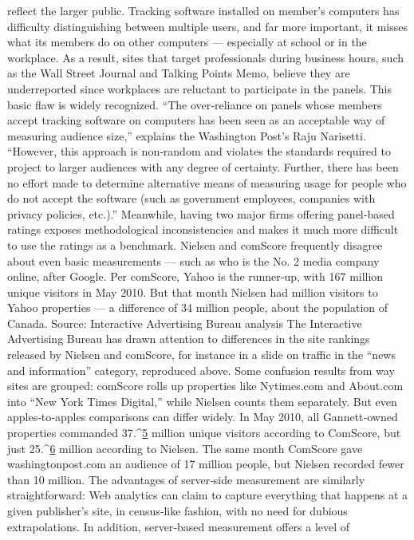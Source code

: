 reflect the larger public. Tracking software installed on member’s
computers has difficulty distinguishing between multiple users, and far
more important, it misses what its members do on other computers —
especially at school or in the workplace. As a result, sites that target
professionals during business hours, such as the Wall Street Journal and
Talking Points Memo, believe they are underreported since workplaces are
reluctant to participate in the panels.
This basic flaw is widely recognized. ``The over‐reliance on panels whose
members accept tracking software on computers has been seen as an
acceptable way of measuring audience size,'' explains the Washington
Post’s Raju Narisetti. ``However, this approach is non‐random and violates
the standards required to project to larger audiences with any degree of
certainty. Further, there has been no effort made to determine alternative
means of measuring usage for people who do not accept the software
(such as government employees, companies with privacy policies, etc.).''
Meanwhile, having two major firms offering panel‐based ratings exposes
methodological inconsistencies and makes it much more difficult to use
the ratings as a benchmark. Nielsen and comScore frequently disagree
about even basic measurements — such as who is the No. 2 media
company online, after Google. Per comScore, Yahoo is the runner‐up, with
167 million unique visitors in May 2010. But that month Nielsen had
million visitors to Yahoo properties — a difference of 34 million people,
about the population of Canada.
Source: Interactive Advertising Bureau analysis
The Interactive Advertising Bureau has drawn attention to differences in
the site rankings released by Nielsen and comScore, for instance in a slide
on traffic in the ``news and information'' category, reproduced above.
Some confusion results from way sites are grouped: comScore rolls up
properties like Nytimes.com and About.com into ``New York Times
Digital,'' while Nielsen counts them separately. But even apples‐to‐apples
comparisons can differ widely. In May 2010, all Gannett‐owned properties
commanded 37.^{\href{#endnotes}{5}} million unique visitors according to ComScore, but just
25.^{\href{#endnotes}{6}} million according to Nielsen. The same month ComScore gave
washingtonpost.com an audience of 17 million people, but Nielsen
recorded fewer than 10 million.
The advantages of server‐side measurement are similarly straightforward:
Web analytics can claim to capture everything that happens at a given
publisher’s site, in census‐like fashion, with no need for dubious
extrapolations. In addition, server‐based measurement offers a level of
